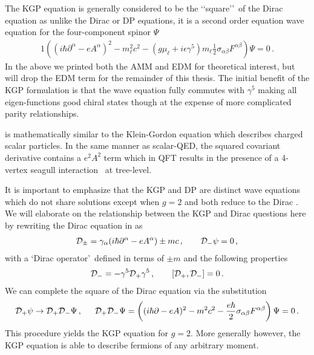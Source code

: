 The KGP equation is generally considered to be the \lq\lq square\rq\rq\ of the Dirac equation as unlike the Dirac or DP equations, it is a second order equation wave equation for the four-component spinor $\Psi$
\begin{alignat}{1}
	\label{kgp:1} \left((i\hbar\partial^{\alpha}-eA^{\alpha})^{2}-m_{\ell}^{2}c^{2}-\left(g\mu_{\ell}+i\epsilon\gamma^{5}\right)m_{\ell}\frac{1}{2}\sigma_{\alpha\beta}F^{\alpha\beta}\right)\Psi=0\,.
\end{alignat}
In the above we printed both the AMM and EDM for theoretical interest, but will drop the EDM term for the remainder of this thesis. The initial benefit of the KGP formulation is that the wave equation fully commutes with $\gamma^{5}$ making all eigen-functions good chiral states though at the expense of more complicated parity relationships.

 is mathematically similar to the Klein-Gordon equation which describes charged scalar particles. In the same manner as scalar-QED, the squared covariant derivative contains a $e^{2}A^{2}$ term which in QFT results in the presence of a 4-vertex seagull interaction~\citep{Schwartz:2014sze} at tree-level.

It is important to emphasize that the KGP  and DP  are distinct wave equations which do not share solutions except when $g=2$ and both reduce to the Dirac . We will elaborate on the relationship between the KGP and Dirac questions here by rewriting the Dirac equation in  as
\begin{alignat}{1}
	\label{do:1} \mathcal{D}_{\pm}=\gamma_{\alpha}(i\hbar\partial^{\alpha}-eA^{\alpha})\pm mc\,,\qquad
    {\cal D}_{-}\psi=0\,,
\end{alignat}
with a \lq Dirac operator\rq\ defined in terms of $\pm m$ and the following properties
\begin{align}
    \label{do:2}
    \mathcal{D}_{-}=-\gamma^{5}\mathcal{D}_{+}\gamma^{5}\,,\qquad
    [{\cal D}_{+},{\cal D}_{-}]=0\,.
\end{align}
We can complete the square of the Dirac equation via the substitution
\begin{alignat}{1}
	\label{eq:kgp:03} \mathcal{D}_{+}\psi\rightarrow\mathcal{D}_{+}\mathcal{D}_{-}\Psi\,,\indent\mathcal{D}_{+}\mathcal{D}_{-}\Psi=\left((i\hbar\partial-eA)^{2}-m^{2}c^{2}-\frac{e\hbar}{2}\sigma_{\alpha\beta}F^{\alpha\beta}\right)\Psi=0\,.
\end{alignat}
This procedure yields the KGP equation for $g=2$. More generally however, the KGP equation is able to describe fermions of any arbitrary moment.


